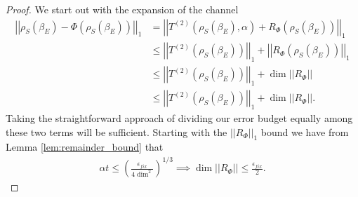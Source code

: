 \documentclass{article}
\newcommand{\parens}[1]{\left( #1 \right)}
\newcommand{\norm}[1]{\left| \left| #1 \right| \right|}
\begin{document}
\begin{proof}
    We start out with the expansion of the channel
    \begin{align}
        \norm{\rho_S(\beta_E) - \Phi(\rho_S(\beta_E))}_1 &= \norm{T^{(2)}(\rho_S(\beta_E), \alpha) + R_{\Phi}(\rho_S(\beta_E))}_1 \\
        &\leq \norm{T^{(2)}(\rho_S(\beta_E))}_1 + \norm{R_{\Phi}(\rho_S(\beta_E))}_1 \\
        &\leq \norm{T^{(2)}(\rho_S(\beta_E))}_1 + \dim \norm{R_{\Phi}} \\
        &\leq \norm{T^{(2)}(\rho_S(\beta_E))}_1 + \dim \norm{R_{\Phi}}.
    \end{align}
    Taking the straightforward approach of dividing our error budget equally among these two terms will be sufficient. Starting with the $\norm{R_{\Phi}}_1$ bound we have from Lemma \ref{lem:remainder_bound} that
    \begin{align}
        \alpha t \leq \parens{\frac{\epsilon_{fix}}{4 \dim^2}}^{1/3} \implies \dim \norm{R_{\Phi}} \leq \frac{\epsilon_{fix}}{2}. \label{tmp:first_alpha_t_req_fixed_pt}
    \end{align}


\end{proof}
\end{document}
